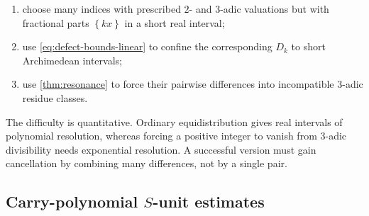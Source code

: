 \documentclass[11pt]{article}
\theoremstyle{definition}
\theoremstyle{remark}
\newcommand{\fracpart}[1]{\left\{#1\right\}}
\begin{document}
\begin{enumerate}
\item choose many indices with prescribed $2$- and $3$-adic valuations but
with fractional parts $\fracpart{kx}$ in a short real interval;
\item use \eqref{eq:defect-bounds-linear} to confine the corresponding
$D_k$ to short Archimedean intervals;
\item use \cref{thm:resonance} to force their pairwise differences into
incompatible $3$-adic residue classes.
\end{enumerate}

The difficulty is quantitative.  Ordinary equidistribution gives real
intervals of polynomial resolution, whereas forcing a positive integer to
vanish from $3$-adic divisibility needs exponential resolution.  A successful
version must gain cancellation by combining many differences, not by a single
pair.

\subsection{Carry-polynomial $S$-unit estimates}
\end{document}
